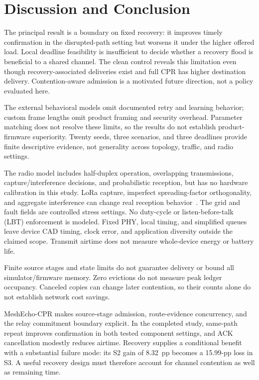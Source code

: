 \section{Discussion and Conclusion}
\label{sec:discussion}

The principal result is a boundary on fixed recovery: it improves timely
confirmation in the disrupted-path setting but worsens it under the
higher offered load. Local deadline feasibility is insufficient to decide
whether a recovery flood is beneficial to a shared channel. The clean
control reveals this limitation even though recovery-associated deliveries
exist and full CPR has higher destination delivery. Contention-aware
admission is a motivated future direction, not a policy evaluated here.

The external behavioral models omit documented retry and learning
behavior; custom frame lengths omit product framing and security overhead.
Parameter matching does not resolve these limits, so the results do not
establish product-firmware superiority. Twenty seeds, three scenarios,
and three deadlines provide finite descriptive evidence, not generality
across topology, traffic, and radio settings.

The radio model includes half-duplex operation, overlapping transmissions,
capture/interference decisions, and probabilistic reception, but has no
hardware calibration in this study. LoRa capture, imperfect spreading-factor
orthogonality, and aggregate interference can change real reception
behavior~\cite{rahmadhani2018concurrent,croce2018orthogonality,heusse2023capacity}.
The grid and fault fields are controlled stress settings. No duty-cycle or
listen-before-talk (LBT) enforcement is modeled. Fixed PHY, local timing,
and simplified queues leave device CAD timing, clock error, and application
diversity outside the claimed scope.
Transmit airtime does not measure whole-device energy or battery life.

Finite source stages and state limits do not guarantee delivery or bound
all simulator/firmware memory. Zero evictions do not measure peak ledger
occupancy. Canceled copies can change later contention, so their counts
alone do not establish network cost savings.

MeshEcho-CPR makes source-stage admission, route-evidence concurrency,
and the relay commitment boundary explicit. In the completed study,
same-path repeat improves confirmation in both tested component settings,
and ACK cancellation modestly reduces airtime. Recovery supplies a
conditional benefit with a substantial failure mode: its S2 gain of
8.32~pp becomes a 15.99-pp loss in S3. A useful recovery design must
therefore account for channel contention as well as remaining time.
